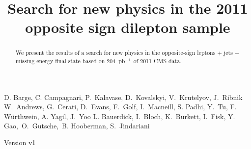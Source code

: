 \documentclass{cmspaper}
\newcommand{\lumi}{204~pb$^{-1}$}
\begin{document}
  

\begin{titlepage}
    \pagestyle {plain}

  \title {Search for new physics in the 2011 opposite sign dilepton sample}
\begin{Authlist}
D. Barge, C. Campagnari, P.~Kalavase, D.~Kovalskyi, V.~Krutelyov, J.~Ribnik
W.~Andrews, G.~Cerati, D.~Evans, F.~Golf, I.~Macneill, S. Padhi, Y.~Tu, F. W\"urthwein, A. Yagil, J.~Yoo
L. Bauerdick, I.~Bloch, K.~Burkett, I.~Fisk, Y.~ Gao,~O.~Gutsche,~B. Hooberman, S.~Jindariani
\end{Authlist}
 
Version v1

    \begin{abstract}
We present the results of a search for new physics in the opposite-sign 
leptons $+$ jets $+$ missing energy final state based on \lumi\
of 2011 CMS data.  

  \end{abstract}

\end{titlepage}
\newpage


\tableofcontents
\newpage
\linenumbers
%









%

%
%

\clearpage

\clearpage
\appendixtitleon
\appendixtitletocon
\begin{appendices}
   
   
   
   
\end{appendices}
\end{document}
